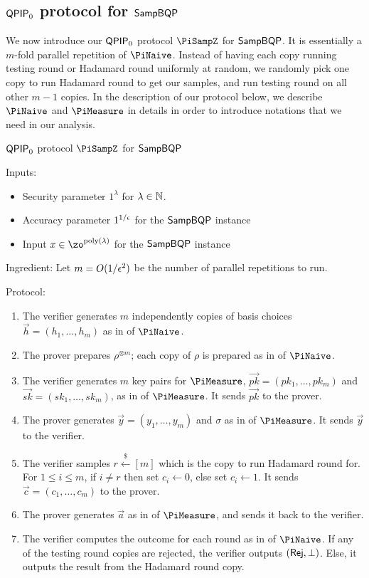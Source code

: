 \subsection{$\operatorname{\mathsf{QPIP}}_0$ protocol for $\operatorname{\mathsf{SampBQP}}$} \label{sec:qpip0}

We now introduce our $\operatorname{\mathsf{QPIP}}_0$ protocol $\PiSampZ$ for $\operatorname{\mathsf{SampBQP}}$.
It is essentially a $m$-fold parallel repetition of $\PiNaive$.
Instead of having each copy running testing round or Hadamard round uniformly at random, we randomly pick one copy to run Hadamard round to get our samples, and run testing round on all other $m-1$ copies.
In the description of our protocol below, we describe $\PiNaive$ and $\PiMeasure$ in details in order to introduce notations that we need in our analysis.

\begin{protocol}{$\operatorname{\mathsf{QPIP}}_0$ protocol $\PiSampZ$ for $\operatorname{\mathsf{SampBQP}}$}
	\label{proto:QPIP0samp}

	Inputs:
	\begin{itemize}
		\item Security parameter $1^\lambda$ for $\lambda\in\mathbb{N}$.
		\item Accuracy parameter $1^{1/\epsilon}$ for the $\operatorname{\mathsf{SampBQP}}$ instance
		\item Input $x\in\zo^{\poly(\lambda)}$ for the $\operatorname{\mathsf{SampBQP}}$ instance
	\end{itemize}

	Ingredient: Let $m=O(1/\epsilon^2)$ be the number of parallel repetitions to run.

	Protocol:
	\begin{enumerate}
		\item The verifier generates $m$ independently copies of basis choices $\vec{h}=(h_1,\ldots,h_m)$ as in  of $\PiNaive$.
		\item The prover prepares $\rho^{\otimes m}$; each copy of $\rho$ is prepared as in  of $\PiNaive$.
		\item The verifier generates $m$ key pairs for $\PiMeasure$, $\vec{pk}=(pk_1,\ldots,pk_m)$ and $\vec{sk}=(sk_1,\ldots,sk_m)$, as in  of $\PiMeasure$.
			It sends $\vec{pk}$ to the prover.
		\item The prover generates $\vec{y}=(y_1,\ldots,y_m)$ and $\sigma$ as in  of $\PiMeasure$.
			It sends $\vec{y}$ to the verifier.
		\item The verifier samples $r\xleftarrow{\$}[m]$ which is the copy to run Hadamard round for.
			For $1\leq i\leq m$, if $i\ne r$ then set $c_i\leftarrow 0$, else set $c_i\leftarrow 1$.
			It sends $\vec{c}=(c_1,\ldots,c_m)$ to the prover.
		\item The prover generates $\vec{a}$ as in  of $\PiMeasure$, and sends it back to the verifier.
		\item The verifier computes the outcome for each round as in  of $\PiNaive$.
			If any of the testing round copies are rejected, the verifier outputs $(\mathsf{Rej}, \bot)$.
			Else, it outputs the result from the Hadamard round copy.
	\end{enumerate}
\end{protocol}

